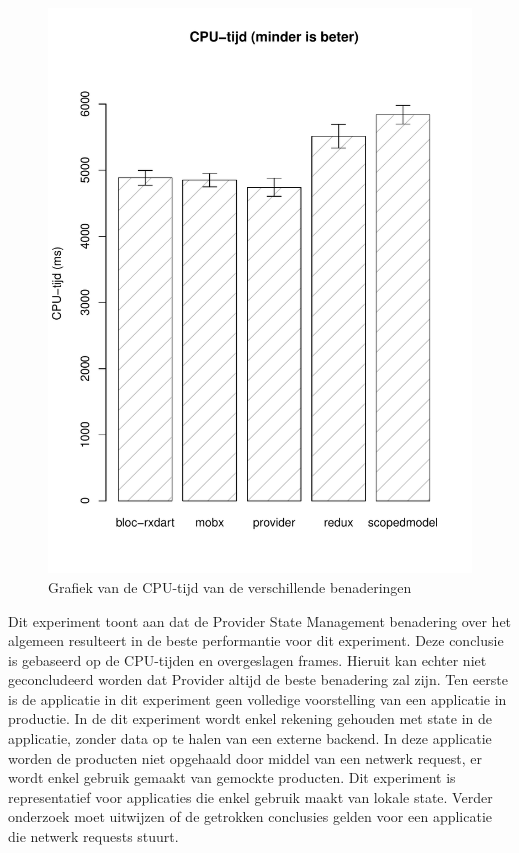 \begin{figure}[H]
    \centering
    \includegraphics[width=0.8\linewidth]{img/experiment/cpu_time.pdf}
    \caption{Grafiek van de CPU-tijd van de verschillende benaderingen}
    \label{fig:graph-cpu-time}
\end{figure}
Dit experiment toont aan dat de Provider State Management benadering over het algemeen resulteert in de beste performantie voor dit experiment. Deze conclusie is gebaseerd op de CPU-tijden en overgeslagen frames. Hieruit kan echter niet geconcludeerd worden dat Provider altijd de beste benadering zal zijn. \newline \newline
Ten eerste is de applicatie in dit experiment geen volledige voorstelling van een applicatie in productie. In de dit experiment wordt enkel rekening gehouden met state in de applicatie, zonder data op te halen van een externe backend. In deze applicatie worden de producten niet opgehaald door middel van een netwerk request, er wordt enkel gebruik gemaakt van gemockte producten. Dit experiment is representatief voor applicaties die enkel gebruik maakt van lokale state. Verder onderzoek moet uitwijzen of de getrokken conclusies gelden voor een applicatie die netwerk requests stuurt. \newline
